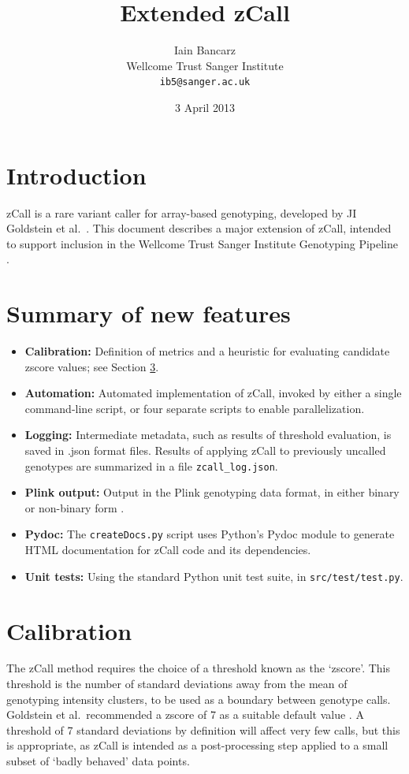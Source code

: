 \documentclass{article}
\title{Extended zCall}
\author{Iain Bancarz\\
  Wellcome Trust Sanger Institute\\
  \texttt{ib5@sanger.ac.uk}}
\date{3 April 2013}
\begin{document}
\maketitle

\section{Introduction}

zCall is a rare variant caller for array-based genotyping, developed by JI Goldstein et al.\ \cite{gold}. This document describes a major extension of zCall, intended to support inclusion in the Wellcome Trust Sanger Institute Genotyping Pipeline \cite{wtsi-gp, wtsi-zcall}.

\section{Summary of new features}

\begin{itemize}
\item \textbf{Calibration:} Definition of metrics and a heuristic for evaluating candidate zscore values; see Section \ref{sec:calib}.
\item \textbf{Automation:} Automated implementation of zCall, invoked by either a single command-line script, or four separate scripts to enable parallelization.
\item \textbf{Logging:} Intermediate metadata, such as results of threshold evaluation, is saved in .json format files. Results of applying zCall to previously uncalled genotypes are summarized in a file \texttt{zcall\_log.json}.
\item \textbf{Plink output:} Output in the Plink genotyping data format, in either binary or non-binary form \cite{plink, plink-soft}.
\item \textbf{Pydoc:} The \texttt{createDocs.py} script uses Python's Pydoc module to generate HTML documentation for zCall code and its dependencies.
\item \textbf{Unit tests:} Using the standard Python unit test suite, in \texttt{src/test/test.py}.
\end{itemize}

\section{Calibration}
\label{sec:calib}

The zCall method requires the choice of a threshold known as the `zscore'. This threshold is the number of standard deviations away from the mean of genotyping intensity clusters, to be used as a boundary between genotype calls. Goldstein et al.\ recommended a zscore of 7 as a suitable default value \cite{gold}. A threshold of 7 standard deviations by definition will affect very few calls, but this is appropriate, as zCall is intended as a post-processing step applied to a small subset of `badly behaved' data points.
\end{document}
